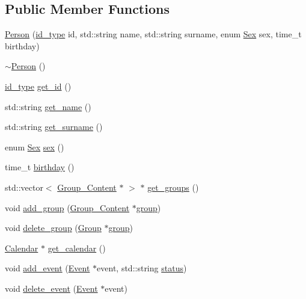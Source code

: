 \subsection*{Public Member Functions}
\begin{DoxyCompactItemize}
\item 
\hyperlink{classPerson_a3f28ee718c6ed2692ecf767ed1b2a86f}{Person} (\hyperlink{types_8h_a0b60c08a3ab1435cccc5643d32d8ccee}{id\_\-type} id, std::string name, std::string surname, enum \hyperlink{classPerson_a328ea8d2e8c2674688c7f944fab70b6b}{Sex} sex, time\_\-t birthday)
\item 
\hyperlink{classPerson_a700ffd693321c5fe6880262acf43d4da}{$\sim$Person} ()
\item 
\hyperlink{types_8h_a0b60c08a3ab1435cccc5643d32d8ccee}{id\_\-type} \hyperlink{classPerson_addbe4758044124636fb0f9d3094c6fcb}{get\_\-id} ()
\item 
std::string \hyperlink{classPerson_a1837ca2f4ba804aeee2a70c1a1fdd468}{get\_\-name} ()
\item 
std::string \hyperlink{classPerson_aad33f79ec5c96aa3ab30c9c4c989fb4b}{get\_\-surname} ()
\item 
enum \hyperlink{classPerson_a328ea8d2e8c2674688c7f944fab70b6b}{Sex} \hyperlink{classPerson_ae73331abe20c0f03fcb04de8a6adde46}{sex} ()
\item 
time\_\-t \hyperlink{classPerson_aec14dd73ca58227cc70c4ba3a5065d02}{birthday} ()
\item 
std::vector$<$ \hyperlink{structGroup__Content}{Group\_\-Content} $\ast$ $>$ $\ast$ \hyperlink{classPerson_a24cd3ad56c42c1cd34505b1094e6e7d5}{get\_\-groups} ()
\item 
void \hyperlink{classPerson_aa17159e6bb16f2a42a1c4bcae08ae903}{add\_\-group} (\hyperlink{structGroup__Content}{Group\_\-Content} $\ast$\hyperlink{group__content_8h_a27517aa1480ab2d9bfe5d62e693b33eb}{group})
\item 
void \hyperlink{classPerson_a93dfe7e17e0316b1f7dddebf5fd3f7ce}{delete\_\-group} (\hyperlink{classGroup}{Group} $\ast$\hyperlink{group__content_8h_a27517aa1480ab2d9bfe5d62e693b33eb}{group})
\item 
\hyperlink{classCalendar}{Calendar} $\ast$ \hyperlink{classPerson_abaaac95db5394d3ad78ad08221b1d231}{get\_\-calendar} ()
\item 
void \hyperlink{classPerson_a57689e959d613756a806e5d32654d3e8}{add\_\-event} (\hyperlink{classEvent}{Event} $\ast$event, std::string \hyperlink{group__content_8h_ab4d38e7365d935f2a5f1403eec29127e}{status})
\item 
void \hyperlink{classPerson_ab788997b3b66a72e51f924d416029ff5}{delete\_\-event} (\hyperlink{classEvent}{Event} $\ast$event)
\end{DoxyCompactItemize}


